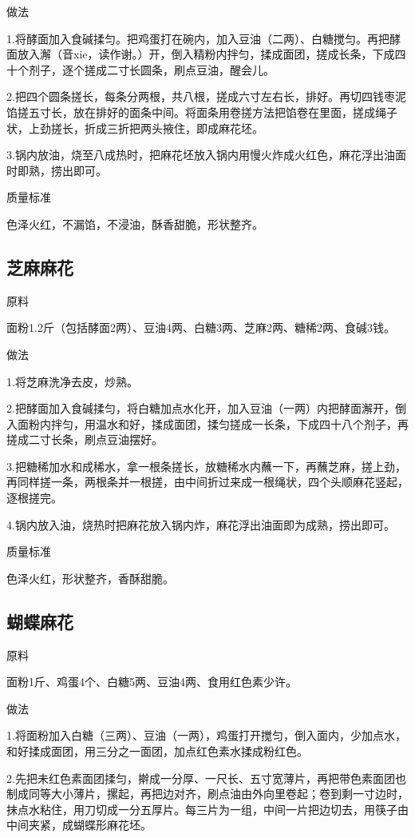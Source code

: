 \documentclass{ctexbook}
\begin{document}
做法

1.将酵面加入食碱揉匀。把鸡蛋打在碗内，加入豆油（二两）、白糖搅匀。再把酵面放入澥（音xie，读作谢。）开，倒入精粉内拌匀，揉成面团，搓成长条，下成四十个剂子，逐个搓成二寸长圆条，刷点豆油，醒会儿。

2.把四个圆条搓长，每条分两根，共八根，搓成六寸左右长，排好。再切四钱枣泥馅搓五寸长，放在排好的面条中间。将面条用卷搓方法把馅卷在里面，搓成绳子状，上劲搓长，折成三折把两头掖住，即成麻花坯。

3.锅内放油，烧至八成热时，把麻花坯放入锅内用慢火炸成火红色，麻花浮出油面时即熟，捞出即可。

质量标准

色泽火红，不漏馅，不浸油，酥香甜脆，形状整齐。
\subsection{芝麻麻花}
原料

面粉1.2斤（包括酵面2两）、豆油4两、白糖3两、芝麻2两、糖稀2两、食碱3钱。

做法

1.将芝麻洗净去皮，炒熟。

2.把酵面加入食碱揉匀，将白糖加点水化开，加入豆油（一两）内把酵面澥开，倒入面粉内拌匀，用温水和好，揉成面团，揉匀搓成一长条，下成四十八个剂子，再搓成二寸长条，刷点豆油摆好。

3.把糖稀加水和成稀水，拿一根条搓长，放糖稀水内蘸一下，再蘸芝麻，搓上劲，再同样搓一条，两根条并一根搓，由中间折过来成一根绳状，四个头顺麻花竖起，逐根搓完。

4.锅内放入油，烧热时把麻花放入锅内炸，麻花浮出油面即为成熟，捞出即可。

质量标准

色泽火红，形状整齐，香酥甜脆。
\subsection{蝴蝶麻花}
原料

面粉1斤、鸡蛋4个、白糖5两、豆油4两、食用红色素少许。

做法

1.将面粉加入白糖（三两）、豆油（一两），鸡蛋打开搅匀，倒入面内，少加点水，和好揉成面团，用三分之一面团，加点红色素水揉成粉红色。

2.先把未红色素面团揉匀，擀成一分厚、一尺长、五寸宽薄片，再把带色素面团也制成同等大小薄片，摞起，再把边对齐，刷点油由外向里卷起；卷到剩一寸边时，抹点水粘住，用刀切成一分五厚片。每三片为一组，中间一片把边切去，用筷子由中间夹紧，成蝴蝶形麻花坯。
\end{document}
